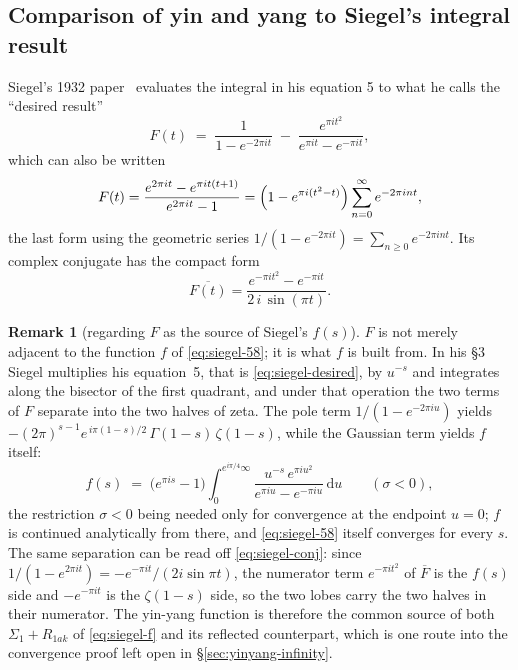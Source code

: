 \documentclass[11pt]{article}
\theoremstyle{definition}
\newtheorem{remark}[theorem]{Remark}
\begin{document}
\subsection{Comparison of yin and yang to Siegel's integral result}\label{sec:yinyang-siegel}

Siegel's 1932 paper~\cite{Siegel1932} evaluates the integral in his equation 5
to what he calls the ``desired result''
\begin{equation}\label{eq:siegel-desired}
F(t)\;=\;
\frac{1}{1-e^{-2\pi i t}}
\;-\;
\frac{e^{\pi i t^{2}}}{e^{\pi i t}-e^{-\pi i t}} ,
\end{equation}
which can also be written
\begin{equation}\label{eq:siegel-desired-alt}
F(t)
=\frac{e^{2\pi i t}-e^{\pi i t(t+1)}}{e^{2\pi i t}-1}
=\Bigl(1-e^{\pi i (t^{2}-t)}\Bigr)\sum_{n=0}^{\infty}e^{-2\pi i n t},
\end{equation}
the last form using the geometric series
$1/(1-e^{-2\pi i t})=\sum_{n\ge0}e^{-2\pi i n t}$. Its complex conjugate has
the compact form
\begin{equation}\label{eq:siegel-conj}
\overline{F(t)}
=\frac{e^{-\pi i t^{2}}-e^{-\pi i t}}{2\,i\,\sin(\pi t)} .
\end{equation}

\begin{remark}[regarding $F$ as the source of Siegel's $f(s)$]\label{rem:F-to-f}
$F$ is not merely adjacent to the function $f$ of \eqref{eq:siegel-58}; it is
what $f$ is built from. In his \S3 Siegel multiplies his equation~5, that is
\eqref{eq:siegel-desired}, by $u^{-s}$ and integrates along the bisector of the
first quadrant, and under that operation the two terms of $F$ separate into the
two halves of zeta. The pole term $1/(1-e^{-2\pi iu})$ yields
$-(2\pi)^{s-1}e^{\,i\pi(1-s)/2}\,\Gamma(1-s)\,\zeta(1-s)$, while the Gaussian
term yields $f$ itself:
\begin{equation}\label{eq:f-from-F}
f(s)\;=\;\bigl(e^{\pi i s}-1\bigr)
\int_{0}^{e^{i\pi/4}\infty}
\frac{u^{-s}\,e^{\pi i u^{2}}}{e^{\pi i u}-e^{-\pi i u}}\,\mathrm{d}u
\qquad (\sigma<0),
\end{equation}
the restriction $\sigma<0$ being needed only for convergence at the endpoint
$u=0$; $f$ is continued analytically from there, and \eqref{eq:siegel-58} itself
converges for every $s$. The same separation can be read off
\eqref{eq:siegel-conj}: since $1/(1-e^{2\pi it})=-e^{-\pi it}/(2i\sin\pi t)$,
the numerator term $e^{-\pi it^{2}}$ of $\overline{F}$ is the $f(s)$ side and
$-e^{-\pi it}$ is the $\zeta(1-s)$ side, so the two lobes carry the two halves
in their numerator. The yin-yang function is therefore the common source of both
$\Sigma_1+R_{1ak}$ of \eqref{eq:siegel-f} and its reflected counterpart, which
is one route into the convergence proof left open in
\S\ref{sec:yinyang-infinity}.
\end{remark}
\end{document}

